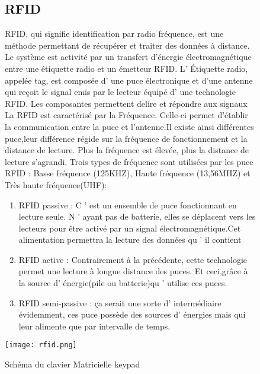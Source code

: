 \documentclass[12pt, openany]{report}
\begin{document}
 \begin{figure}[!h]
                 \centering
 \subsection{RFID}
 RFID, qui signifie identification par radio fréquence, est une méthode permettant de récupérer et traiter des données à distance. Le système est activité par un transfert d’énergie électromagnétique entre une étiquette radio et un émetteur RFID. L' Étiquette radio, appelée tag, est composée d’ une puce électronique et d’une antenne qui reçoit le signal emis par le lecteur équipé d’ une technologie RFID. Les composantes permettent delire et répondre aux signaux
  La RFID est caractérisé par la Fréquence. Celle-ci permet d’établir la communication entre la puce et l’antenne.Il existe ainsi différentes puce,leur différence régide sur la fréquence de fonctionnement et la distance de lecture. Plus la fréquence est élevée, plus la distance de lecture s’agrandi. Trois types de fréquence sont utilisées par les puce RFID : Basse fréquence (125KHZ), Haute fréquence (13,56MHZ) et Très haute fréquence(UHF):
  \begin{enumerate}
  \item  RFID passive : C ’ est un ensemble de puce fonctionnant en lecture seule. N ’ ayant pas de batterie, elles se déplacent vers les lecteurs pour être activé par un signal électromagnétique.Cet alimentation permettra la lecture des données qu ’ il contient
  \item  RFID active : Contrairement à la précédente, cette technologie permet une lecture à longue distance des puces. Et ceci,grâce à la source d’ énergie(pile ou batterie)qu ’ utilise ces puces. 
  \item  RFID semi-passive : ça serait une sorte d’ intermédiaire évidemment, ces puce possède des sources d’ énergies mais qui leur alimente que par intervalle de temps.
  
  \end{enumerate} 
 
 \texttt{[image: rfid.png]} 
          \caption{Schéma du clavier Matricielle keypad}
               		          		
 \end{figure}

          \newpage      	
\end{document}
